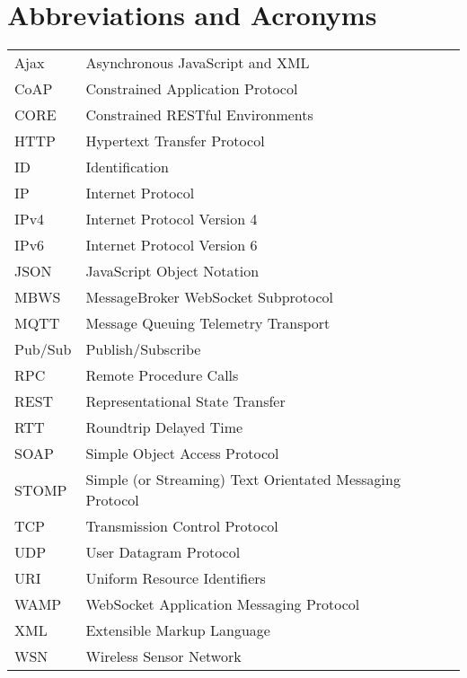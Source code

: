 \chapter*{Abbreviations and Acronyms}


\noindent
\begin{longtable}{@{}p{}p{}@{}}
Ajax & Asynchronous JavaScript and XML \\
CoAP & Constrained Application Protocol \\
CORE & Constrained RESTful Environments \\
HTTP & Hypertext Transfer Protocol \\
ID & Identification \\
IP & Internet Protocol \\
IPv4 & Internet Protocol Version 4 \\
IPv6 & Internet Protocol Version 6 \\
JSON & JavaScript Object Notation \\
MBWS & MessageBroker WebSocket Subprotocol \\
MQTT & Message Queuing Telemetry Transport \\
Pub/Sub & Publish/Subscribe \\
RPC & Remote Procedure Calls \\
REST & Representational State Transfer \\
RTT & Roundtrip Delayed Time \\
SOAP & Simple Object Access Protocol \\
STOMP & Simple (or Streaming) Text Orientated Messaging Protocol \\
TCP & Transmission Control Protocol \\
UDP & User Datagram Protocol \\
URI & Uniform Resource Identifiers \\
WAMP & WebSocket Application Messaging Protocol \\
XML & Extensible Markup Language \\
WSN & Wireless Sensor Network \\
\end{longtable}
